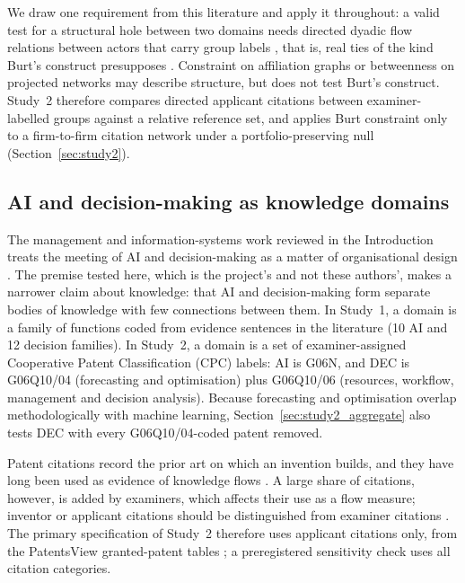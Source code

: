 We draw one requirement from this literature and apply it throughout: a valid test for a structural hole between two domains needs directed dyadic flow relations between actors that carry group labels \citep{gould1989structures}, that is, real ties of the kind Burt's construct presupposes \citep{burt2004structural}. Constraint on affiliation graphs or betweenness on projected networks may describe structure, but does not test Burt's construct. Study~2 therefore compares directed applicant citations between examiner-labelled groups against a relative reference set, and applies Burt constraint only to a firm-to-firm citation network under a portfolio-preserving null (Section~\ref{sec:study2}).

\subsection{AI and decision-making as knowledge domains}
\label{sec:theory_domains}

The management and information-systems work reviewed in the Introduction treats the meeting of AI and decision-making as a matter of organisational design \citep{shrestha2019organizational,raisch2021artificial,jarrahi2018artificial,berente2021managing}. The premise tested here, which is the project's and not these authors', makes a narrower claim about knowledge: that AI and decision-making form separate bodies of knowledge with few connections between them. In Study~1, a domain is a family of functions coded from evidence sentences in the literature (10 AI and 12 decision families). In Study~2, a domain is a set of examiner-assigned Cooperative Patent Classification (CPC) labels: AI is G06N, and DEC is G06Q10/04 (forecasting and optimisation) plus G06Q10/06 (resources, workflow, management and decision analysis). Because forecasting and optimisation overlap methodologically with machine learning, Section~\ref{sec:study2_aggregate} also tests DEC with every G06Q10/04-coded patent removed.

Patent citations record the prior art on which an invention builds, and they have long been used as evidence of knowledge flows \citep{jaffe1993geographic}. A large share of citations, however, is added by examiners, which affects their use as a flow measure; inventor or applicant citations should be distinguished from examiner citations \citep{alcacer2006patent}. The primary specification of Study~2 therefore uses applicant citations only, from the PatentsView granted-patent tables \citep{uspto2026patentsview}; a preregistered sensitivity check uses all citation categories.

